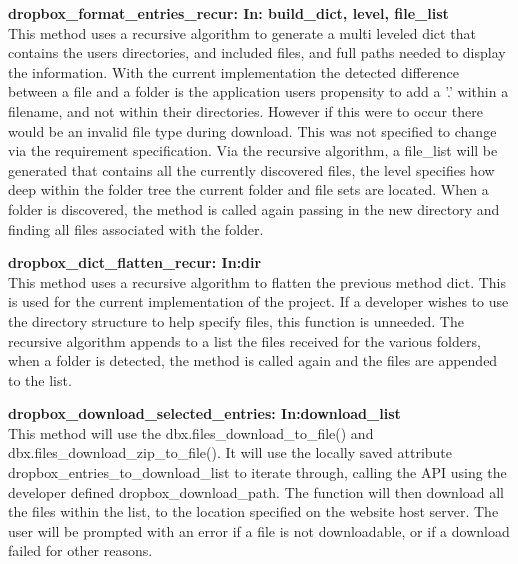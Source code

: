 \textbf{dropbox\_format\_entries\_recur: In: build\_dict, level, file\_list} \\
    This method uses a recursive algorithm to generate a multi leveled dict that contains the users directories, and included files, and full
    paths needed to display the information. With the current implementation the detected difference between a file and a folder is the application
    users propensity to add a '.' within a filename, and not within their directories. However if this were to occur there would be an invalid file
    type during download. This was not specified to change via the requirement specification. Via the recursive algorithm, a file\_list will be 
    generated that contains all the currently discovered files, the level specifies how deep within the folder tree the current folder and file sets 
    are located. When a folder is discovered, the method is called again passing in the new directory and finding all files associated with the folder.

\textbf{dropbox\_dict\_flatten\_recur: In:dir} \\
    This method uses a recursive algorithm to flatten the previous method dict. This is used for the current implementation of the project. If 
    a developer wishes to use the directory structure to help specify files, this function is unneeded. The recursive algorithm appends to a list the 
    files received for the various folders, when a folder is detected, the method is called again and the files are appended to the list.

\textbf{dropbox\_download\_selected\_entries: In:download\_list} \\
    This method will use the dbx.files\_download\_to\_file() and dbx.files\_download\_zip\_to\_file(). It will use the locally saved attribute 
    dropbox\_entries\_to\_download\_list to iterate through, calling the API using the developer defined dropbox\_download\_path. The function 
    will then download all the files within the list, to the location specified on the website host server. The user will be prompted with an 
    error if a file is not downloadable, or if a download failed for other reasons.

